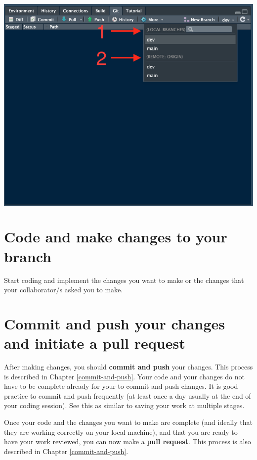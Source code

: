 \documentclass[
  12pt,
]{book}
\begin{document}
\includegraphics{images/git_branch3.png}

\hypertarget{code-and-make-changes-to-your-branch}{%
\section{Code and make changes to your branch}\label{code-and-make-changes-to-your-branch}}

Start coding and implement the changes you want to make or the changes that your collaborator/s asked you to make.

\hypertarget{commit-and-push-your-changes-and-initiate-a-pull-request}{%
\section{Commit and push your changes and initiate a pull request}\label{commit-and-push-your-changes-and-initiate-a-pull-request}}

After making changes, you should \textbf{commit and push} your changes. This process is described in Chapter \ref{commit-and-push}. Your code and your changes do not have to be complete already for your to commit and push changes. It is good practice to commit and push frequently (at least once a day usually at the end of your coding session). See this as similar to saving your work at multiple stages.

Once your code and the changes you want to make are complete (and ideally that they are working correctly on your local machine), and that you are ready to have your work reviewed, you can now make a \textbf{pull request}. This process is also described in Chapter \ref{commit-and-push}.
\end{document}
